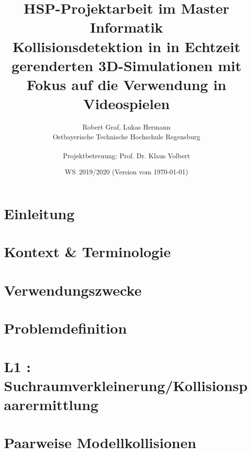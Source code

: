 \documentclass[11pt,twoside,a4paper]{article}
\begin{document}
\title{HSP-Projektarbeit im Master Informatik \\
\small Kollisionsdetektion in in Echtzeit gerenderten 3D-Simulationen mit Fokus auf die Verwendung in Videospielen}
\author{Robert Graf, Lukas Hermann\\
  Ostbayerische Technische Hochschule Regensburg\\
  \\
  Projektbetreuung: Prof. Dr. Klaus Volbert
}
  
\date{WS\, 2019/2020 (Version vom \today)}


\maketitle

\newpage
\tableofcontents



\section{Einleitung}


\section{Kontext \& Terminologie}



\section{Verwendungszwecke}


\section{Problemdefinition}




\section{L1 : Suchraumverkleinerung/Kollisionspaarermittlung}

\section{Paarweise Modellkollisionen}

\end{document}
